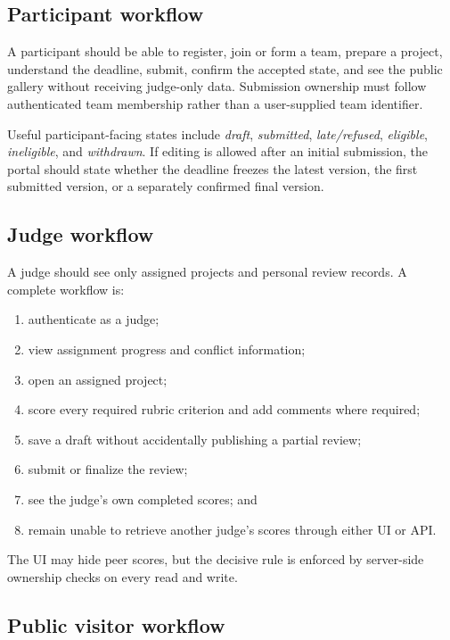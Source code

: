\subsection{Participant workflow}

A participant should be able to register, join or form a team, prepare a project, understand the deadline, submit, confirm the accepted state, and see the public gallery without receiving judge-only data. Submission ownership must follow authenticated team membership rather than a user-supplied team identifier.

Useful participant-facing states include \emph{draft}, \emph{submitted}, \emph{late/refused}, \emph{eligible}, \emph{ineligible}, and \emph{withdrawn}. If editing is allowed after an initial submission, the portal should state whether the deadline freezes the latest version, the first submitted version, or a separately confirmed final version.

\subsection{Judge workflow}

A judge should see only assigned projects and personal review records. A complete workflow is:

\begin{enumerate}
  \item authenticate as a judge;
  \item view assignment progress and conflict information;
  \item open an assigned project;
  \item score every required rubric criterion and add comments where required;
  \item save a draft without accidentally publishing a partial review;
  \item submit or finalize the review;
  \item see the judge's own completed scores; and
  \item remain unable to retrieve another judge's scores through either UI or API\@.
\end{enumerate}

The UI may hide peer scores, but the decisive rule is enforced by server-side ownership checks on every read and write.

\subsection{Public visitor workflow}

